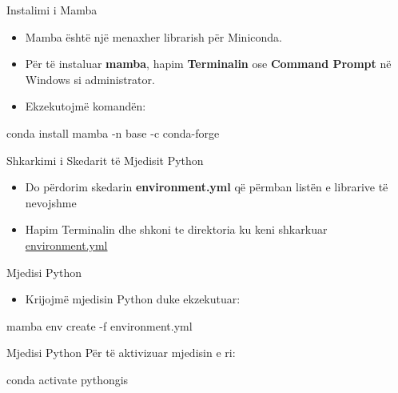 \documentclass[
  ignorenonframetext,
]{beamer}
\newenvironment{Shaded}{\begin{snugshade}}{\end{snugshade}}
\newcommand{\NormalTok}[1]{#1}
\providecommand{\tightlist}{%
  \setlength{\itemsep}{0pt}\setlength{\parskip}{0pt}}
\begin{document}
\begin{frame}[fragile]{Instalimi i Mamba}
\protect\hypertarget{instalimi-i-mamba}{}
\begin{itemize}
\item
  Mamba është një menaxher librarish për Miniconda.
\item
  Për të instaluar \textbf{mamba}, hapim \textbf{Terminalin} ose
  \textbf{Command Prompt} në Windows si administrator.
\item
  Ekzekutojmë komandën:
\end{itemize}

\begin{Shaded}
\begin{Highlighting}[]
\NormalTok{  conda install mamba {-}n base {-}c conda{-}forge}
\end{Highlighting}
\end{Shaded}
\end{frame}

\begin{frame}{Shkarkimi i Skedarit të Mjedisit Python}
\protect\hypertarget{shkarkimi-i-skedarit-tuxeb-mjedisit-python}{}
\begin{itemize}
\item
  Do përdorim skedarin \textbf{environment.yml} që përmban listën e
  librarive të nevojshme
\item
  Hapim Terminalin dhe shkoni te direktoria ku keni shkarkuar
  \href{https://github.com/endri81/instatgis/blob/master/environment.yml}{environment.yml}
\end{itemize}
\end{frame}

\begin{frame}[fragile]{Mjedisi Python}
\protect\hypertarget{mjedisi-python}{}
\begin{itemize}
\tightlist
\item
  Krijojmë mjedisin Python duke ekzekutuar:
\end{itemize}

\begin{Shaded}
\begin{Highlighting}[]
\NormalTok{mamba env create {-}f environment.yml}
\end{Highlighting}
\end{Shaded}
\end{frame}

\begin{frame}[fragile]{Mjedisi Python}
\protect\hypertarget{mjedisi-python-1}{}
Për të aktivizuar mjedisin e ri:

\begin{Shaded}
\begin{Highlighting}[]
\NormalTok{conda activate pythongis}
\end{Highlighting}
\end{Shaded}
\end{frame}
\end{document}

